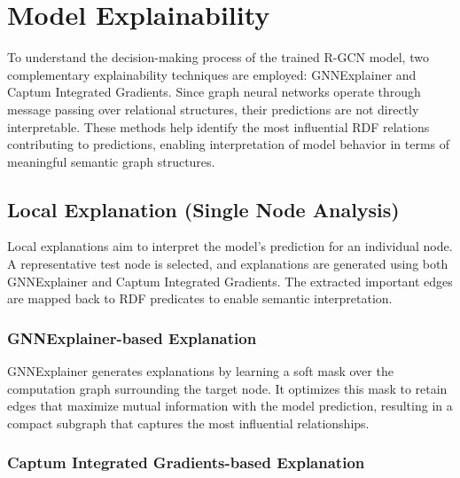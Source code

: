 \documentclass[runningheads]{llncs}
\begin{document}

\section{Model Explainability}

To understand the decision-making process of the trained R-GCN model, two complementary explainability techniques are employed: GNNExplainer and Captum Integrated Gradients. Since graph neural networks operate through message passing over relational structures, their predictions are not directly interpretable. These methods help identify the most influential RDF relations contributing to predictions, enabling interpretation of model behavior in terms of meaningful semantic graph structures.

\subsection{Local Explanation (Single Node Analysis)}

Local explanations aim to interpret the model’s prediction for an individual node. A representative test node is selected, and explanations are generated using both GNNExplainer and Captum Integrated Gradients. The extracted important edges are mapped back to RDF predicates to enable semantic interpretation.

\subsubsection{GNNExplainer-based Explanation}

GNNExplainer generates explanations by learning a soft mask over the computation graph surrounding the target node. It optimizes this mask to retain edges that maximize mutual information with the model prediction, resulting in a compact subgraph that captures the most influential relationships.

\subsubsection{Captum Integrated Gradients-based Explanation}
\end{document}
